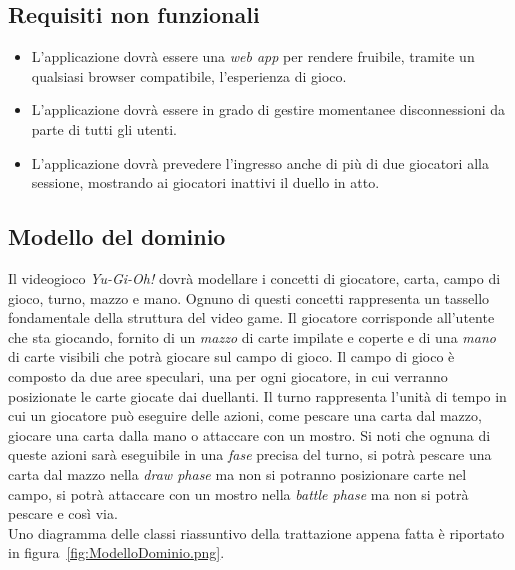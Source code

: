     \subsection{Requisiti non funzionali}\label{subsec:requisitiNonFunzionali}
        \begin{itemize}
            \item L'applicazione dovrà essere una \textit{web app} per rendere fruibile, tramite un qualsiasi browser compatibile, l'esperienza di gioco.
            \item L'applicazione dovrà essere in grado di gestire momentanee disconnessioni da parte di tutti gli utenti.
            \item L'applicazione dovrà prevedere l'ingresso anche di più di due giocatori alla sessione, mostrando ai giocatori inattivi il duello in atto.
        \end{itemize}

    \subsection{Modello del dominio}
        Il videogioco \textit{Yu-Gi-Oh!} dovrà modellare i concetti di giocatore, carta, campo di gioco, turno, mazzo e mano. Ognuno di questi concetti rappresenta un tassello fondamentale
        della struttura del video game. Il giocatore corrisponde all'utente che sta giocando, fornito di un \textit{mazzo} di carte impilate e coperte e di una \textit{mano} di
        carte visibili che potrà giocare sul campo di gioco. Il campo di gioco è composto da due aree speculari, una per ogni giocatore, in cui verranno posizionate le carte giocate
        dai duellanti. Il turno rappresenta l'unità di tempo in cui un giocatore può eseguire delle azioni, come pescare una carta dal mazzo, giocare una carta dalla mano o attaccare
        con un mostro. Si noti che ognuna di queste azioni sarà eseguibile in una \textit{fase} precisa del turno, si potrà pescare una carta dal mazzo nella \textit{draw phase} ma
        non si potranno posizionare carte nel campo, si potrà attaccare con un mostro nella \textit{battle phase} ma non si potrà pescare e così via.\\
        Uno diagramma delle classi riassuntivo della trattazione appena fatta è riportato in figura~\ref{fig:ModelloDominio.png}.\\
    